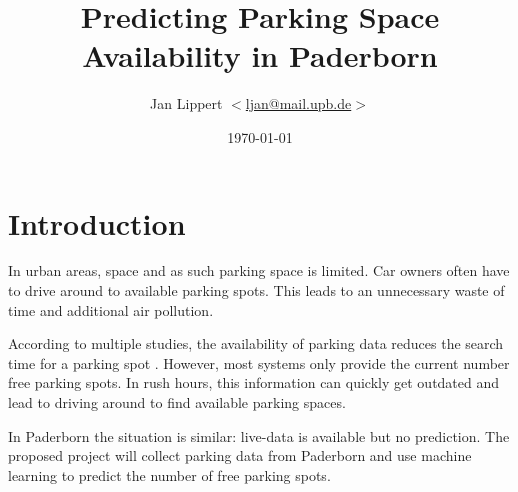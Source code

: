 \documentclass[journal,10pt]{IEEEtran}
\title{Predicting Parking Space Availability in Paderborn}
\author{Jan Lippert \(<\)\href{mailt:ljan@mail.upb.de}{ljan@mail.upb.de}\(>\)}
\date{\today}
\begin{document}
\maketitle

\section{Introduction}

In urban areas, space and as such parking space is limited. Car owners often have to drive around to available parking spots. This leads to an unnecessary waste of time and additional air pollution. 

According to multiple studies, the availability of parking data reduces the search time for a parking spot \cite{Asakura1994}\cite{Caicedo2010228}. However, most systems only provide the current number free parking spots. In rush hours, this information can quickly get outdated and lead to driving around to find available parking spaces.

In Paderborn the situation is similar: live-data is available but no prediction. The proposed project will collect parking data from Paderborn and use machine learning to predict the number of free parking spots.







\end{document}
